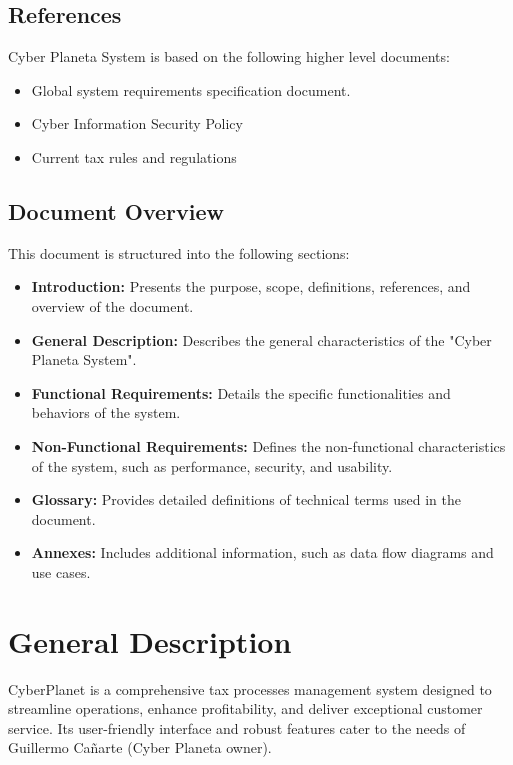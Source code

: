 \documentclass[12pt,a4paper, twosite]{article}
\begin{document}
\subsection{References}
\label{sec:org62711e0}

Cyber Planeta System is based on the following higher level documents:
\begin{itemize}
    \item Global system requirements specification document.
    \item Cyber Information Security Policy
    \item Current tax rules and regulations
\end{itemize}


\subsection{Document Overview}
\label{sec:orgdaca22c}
This document is structured into the following sections:

\begin{itemize}
  \item \textbf{Introduction:} Presents the purpose, scope, definitions, references, and overview of the document.
  \item \textbf{General Description:} Describes the general characteristics of the "Cyber Planeta System".
  \item \textbf{Functional Requirements:} Details the specific functionalities and behaviors of the system.
  \item \textbf{Non-Functional Requirements:} Defines the non-functional characteristics of the system, such as performance, security, and usability.
  \item \textbf{Glossary:} Provides detailed definitions of technical terms used in the document.
  \item \textbf{Annexes:} Includes additional information, such as data flow diagrams and use cases.
\end{itemize}


\section{General Description}
\label{sec:orgc1c4017}

CyberPlanet is a comprehensive tax processes management system designed to streamline operations, enhance profitability, and deliver exceptional customer service. Its user-friendly interface and robust features cater to the needs of Guillermo Cañarte (Cyber Planeta owner).
\end{document}
